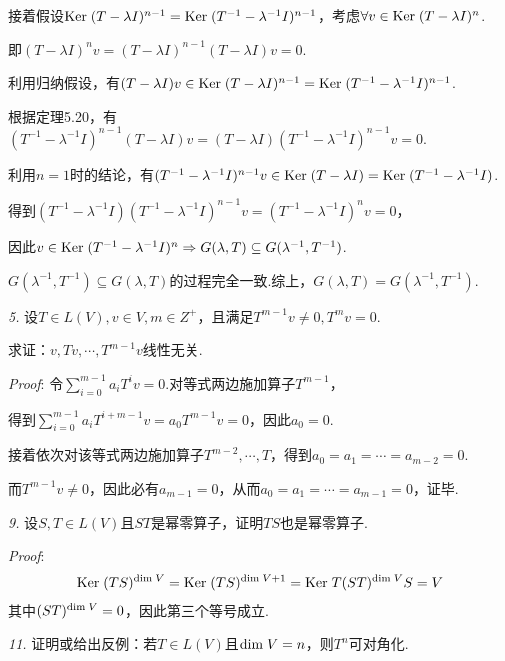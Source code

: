 接着假设\(\mathrm{Ker \;} (T-\lambda I)^{n-1}=\mathrm{Ker \;} (T^{-1}-\lambda^{-1} I)^{n-1}\)，考虑\(\forall v \in \mathrm{Ker \;} (T-\lambda I)^n\).

即\((T-\lambda I)^n v=(T-\lambda I)^{n-1}(T-\lambda I)v=0\).

利用归纳假设，有\((T-\lambda I)v \in \mathrm{Ker \;} (T-\lambda I)^{n-1}=\mathrm{Ker \;} (T^{-1}-\lambda^{-1} I)^{n-1}\).

根据定理5.20，有\((T^{-1}-\lambda^{-1} I)^{n-1}(T-\lambda I)v=(T-\lambda I)(T^{-1}-\lambda^{-1} I)^{n-1}v=0\).

利用\(n=1\)时的结论，有\((T^{-1}-\lambda^{-1} I)^{n-1}v \in \mathrm{Ker \;} (T-\lambda I)=\mathrm{Ker \;} (T^{-1}-\lambda^{-1} I)\).

得到\((T^{-1}-\lambda^{-1} I)(T^{-1}-\lambda^{-1} I)^{n-1}v=(T^{-1}-\lambda^{-1} I)^n v=0\)，

因此\(v \in \mathrm{Ker \;} (T^{-1}-\lambda^{-1} I)^n \Rightarrow G(\lambda,T) \subseteq G(\lambda^{-1},T^{-1})\).

\(G(\lambda^{-1},T^{-1}) \subseteq G(\lambda,T)\)的过程完全一致.综上，\(G(\lambda,T)=G(\lambda^{-1},T^{-1})\).

\hspace*{\fill}

\textit{5.}
设\(T \in L(V),v \in V,m \in Z^+\)，且满足\(T^{m-1}v \ne 0,T^m v=0\).

求证：\(v,Tv,\cdots,T^{m-1}v\)线性无关.

\textit{Proof}:
令\(\sum_{i=0}^{m-1} a_iT^i v=0\).对等式两边施加算子\(T^{m-1}\)，

得到\(\sum_{i=0}^{m-1} a_iT^{i+m-1} v=a_0T^{m-1} v=0\)，因此\(a_0=0\).

接着依次对该等式两边施加算子\(T^{m-2},\cdots,T\)，得到\(a_0=a_1=\cdots=a_{m-2}=0\).

而\(T^{m-1}v \ne 0\)，因此必有\(a_{m-1}=0\)，从而\(a_0=a_1=\cdots=a_{m-1}=0\)，证毕.

\hspace*{\fill}

\textit{9.}
设\(S,T \in L(V)\)且\(ST\)是幂零算子，证明\(TS\)也是幂零算子.

\textit{Proof}:
    \begin{align*}
        \mathrm{Ker \;} (TS)^{\mathrm{dim \;} V}=\mathrm{Ker \;} (TS)^{\mathrm{dim \;} V+1}=\mathrm{Ker \;} T(ST)^{\mathrm{dim \;} V}S=V
    \end{align*}
其中\((ST)^{\mathrm{dim \;} V}=0\)，因此第三个等号成立.

\hspace*{\fill}

\textit{11.}
证明或给出反例：若\(T \in L(V)\)且\(\mathrm{dim \;} V=n\)，则\(T^n\)可对角化.

